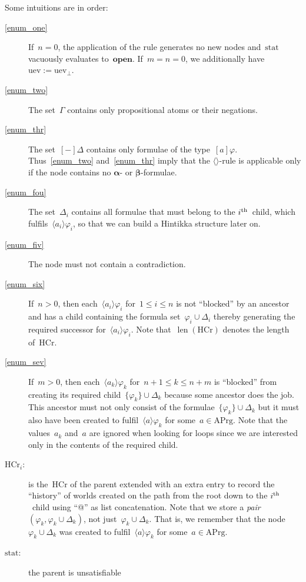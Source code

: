 \documentclass{entcs}
\newcommand{\pea}[2]{\langle#1\rangle #2}
\newcommand{\paa}[2]{[#1] #2}
\newcommand{\act}{\mathrm{APrg}}
\newcommand{\thc}{\mathrm{HCr}}
\newcommand{\tmrk}{\mathrm{stat}}
\newcommand{\tuev}{\mathrm{uev}}
\newcommand{\talpha}{\boldsymbol{\alpha}}
\newcommand{\tbeta}{\boldsymbol{\beta}}
\newcommand{\trea}{$\langle\rangle$}
\newcommand{\tfalse}{\mathbf{open}}
\newcommand{\llen}{\mathop{\mathrm{len}}}
\begin{document}
Some intuitions are in order:
\begin{description}
\item[\rm \ref{enum_one}]
  If~$n = 0$, the application of the rule generates no new nodes
  and~$\tmrk$ vacuously evaluates to~$\tfalse$.
  If~$m = n = 0$, we additionally have~$\tuev := \tuev_{\bot}$.
\item[\rm \ref{enum_two}] The set~$\Gamma$ contains only propositional atoms or their negations.
\item[\rm \ref{enum_thr}] The set~$\paa{-}{\Delta}$ contains only formulae of the type~$\paa{a}\varphi$.
  Thus~\ref{enum_two} and~\ref{enum_thr} imply
  that the \trea{}-rule is applicable only
  if the node contains no $\talpha$- or $\tbeta$-formulae.
\item[\rm \ref{enum_fou}] The set~$\Delta_i$ contains all formulae
  that must belong to the $i^{\rm th}$~child, which fulfils~$\pea{a_i}{\varphi_i}$,
  so that we can build a Hintikka structure later on.
\item[\rm \ref{enum_fiv}] The node must not contain a contradiction.
\item[\rm \ref{enum_six}] If~$n > 0$,
  then each~$\pea{a_i}{\varphi_i}$ for~$1 \leq i \leq n$ is not ``blocked'' by an ancestor
  and has a child containing the formula set~$\varphi_i \cup \Delta_i$
  thereby generating the required successor for~$\pea{a_i}{\varphi_i}$.
  Note that~$\llen(\thc)$ denotes the length of~$\thc$.
\item[\rm \ref{enum_sev}] If~$m > 0$,
  then each~$\pea{a_k}{\varphi_k}$ for~$n+1 \leq k \leq n+m$ is ``blocked''
  from creating its required child~$\{ \varphi_k \} \cup \Delta_k$
  because some ancestor does the job.
  This ancestor must not only consist of the formulae~$\{ \varphi_k \} \cup \Delta_k$
  but it must also have been created to fulfil~$\pea{a}{\varphi_k}$ for some~$a \in \act$.
  Note that the values~$a_k$ and~$a$ are ignored
  when looking for loops
  since we are interested only in the contents of the required child.
\item[\rm $\thc_i$:] is the~$\thc$ of the parent
  extended with an extra entry to record the ``history''
  of worlds created on the path from the root down to the $i^{\rm th}$~child
  using ``@'' as list concatenation.
  Note that we store a \emph{pair}~$(\varphi_k, \varphi_k \cup
  \Delta_k)$, not just~$\varphi_k \cup \Delta_k$.
  That is, we remember that the node~$\varphi_k \cup \Delta_k$ was created
  to fulfil~$\pea{a}{\varphi_k}$ for some~$a \in \act$.
\item[\rm $\tmrk$:] the parent is unsatisfiable

\end{description}
\end{document}
